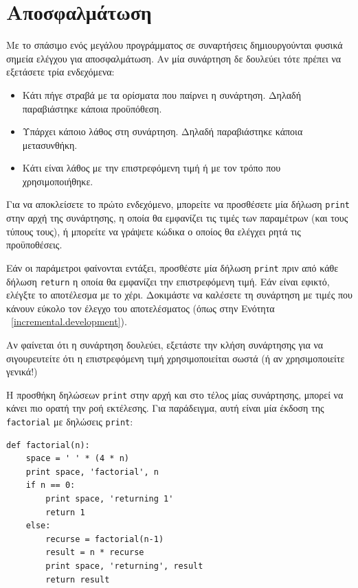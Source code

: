 \documentclass[10pt]{book}
\begin{document}
\section{Αποσφαλμάτωση}
\label{factdebug}

Με το σπάσιμο ενός μεγάλου προγράμματος σε συναρτήσεις δημιουργούνται
φυσικά σημεία ελέγχου για αποσφαλμάτωση. 
Αν μία συνάρτηση δε δουλεύει τότε πρέπει να εξετάσετε τρία ενδεχόμενα:

\begin{itemize}

\item  Κάτι πήγε στραβά με τα ορίσματα που παίρνει η συνάρτηση.
Δηλαδή παραβιάστηκε κάποια προϋπόθεση.

\item  Υπάρχει κάποιο λάθος στη συνάρτηση. Δηλαδή παραβιάστηκε κάποια 
μετασυνθήκη.

\item  Κάτι είναι λάθος με την επιστρεφόμενη τιμή ή με τον τρόπο
που χρησιμοποιήθηκε.

\end{itemize}

Για να αποκλείσετε το πρώτο ενδεχόμενο, μπορείτε να προσθέσετε μία δήλωση
{\tt print} στην αρχή της συνάρτησης, η οποία θα εμφανίζει τις τιμές των
παραμέτρων (και τους τύπους τους), ή μπορείτε να γράψετε κώδικα ο οποίος θα
ελέγχει ρητά τις προϋποθέσεις.

Εάν οι παράμετροι φαίνονται εντάξει, προσθέστε μία δήλωση {\tt print}
πριν από κάθε δήλωση {\tt return} η οποία θα εμφανίζει την
επιστρεφόμενη τιμή. Εάν είναι εφικτό, ελέγξτε το αποτέλεσμα με το χέρι.
Δοκιμάστε να καλέσετε τη συνάρτηση με τιμές που κάνουν εύκολο τον έλεγχο
του αποτελέσματος (όπως στην Ενότητα ~\ref{incremental.development}).

Αν φαίνεται ότι η συνάρτηση δουλεύει, εξετάστε την κλήση συνάρτησης
για να σιγουρευτείτε ότι η επιστρεφόμενη τιμή χρησιμοποιείται σωστά
(ή αν χρησιμοποιείτε γενικά!)

Η προσθήκη δηλώσεων {\tt print} στην αρχή και στο τέλος μίας
συνάρτησης, μπορεί να κάνει πιο ορατή την ροή εκτέλεσης.
Για παράδειγμα, αυτή είναι μία έκδοση της {\tt factorial} με
δηλώσεις {\tt print}:

\begin{verbatim}
def factorial(n):
    space = ' ' * (4 * n)
    print space, 'factorial', n
    if n == 0:
        print space, 'returning 1'
        return 1
    else:
        recurse = factorial(n-1)
        result = n * recurse
        print space, 'returning', result
        return result
\end{verbatim}
%
\end{document}

